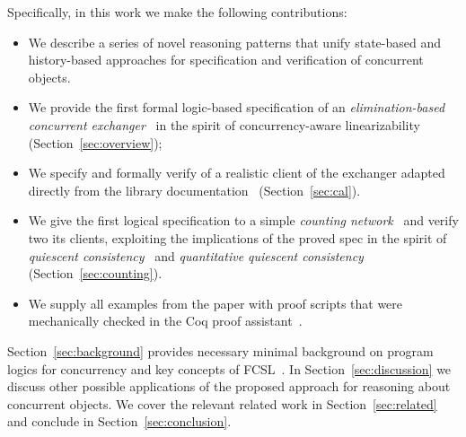 \noindent
Specifically, in this work we make the following contributions:

\vspace{2pt}

\begin{itemize}

\item We describe a series of novel reasoning patterns that unify
  state-based and history-based approaches for specification and
  verification of concurrent objects.

\item We provide the first formal logic-based specification of an
  \emph{elimination-based concurrent
    exchanger}~\cite{Scherer-al:SCOOL05} in the spirit of
  concurrency-aware linearizability~\cite{Hemed-Rinetzky:PODC14}
  (Section~\ref{sec:overview});

\item We specify and formally verify of a realistic client of the
  exchanger adapted directly from the 
  library documentation~\cite{ExchangerClass} (Section~\ref{sec:cal}).

\item We give the first logical specification to a simple
  \emph{counting network}~\cite{Aspnes-al:JACM94} and verify two its
  clients, exploiting the implications of the proved spec in the
  spirit of \emph{quiescent consistency}~\cite{Derrick-al:FM14} and
  \emph{quantitative quiescent
    consistency}~\cite{Jagadeesan-Riely:ICALP14}
  (Section~\ref{sec:counting}).

\item We supply all examples from the paper with proof scripts that
  were mechanically checked in the Coq proof
  assistant~\cite{Coq-manual,Bertot-Casteran:BOOK,Sergey-al:PLDI15}.

\end{itemize}

\vspace{2pt}

\noindent
Section~\ref{sec:background} provides necessary minimal background on
program logics for concurrency and key concepts of
FCSL~\cite{Nanevski-al:ESOP14}. In Section~\ref{sec:discussion} we
discuss other possible applications of the proposed approach for
reasoning about concurrent objects. We cover the relevant related work
in Section~\ref{sec:related} and conclude in
Section~\ref{sec:conclusion}.

